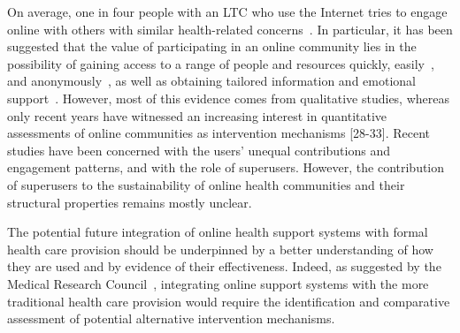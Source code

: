 On average, one in four people with an LTC who use the Internet tries to engage online with others with similar health-related concerns~\cite{fox2011social}. In particular, it has been suggested that the value of participating in an online community lies in the possibility of gaining access to a range of people and resources quickly, easily~\cite{armstrong2000real}, and anonymously~\cite{pendry2015individual}, as well as obtaining tailored information and emotional support~\cite{ali2015online,de2017adolescents,shoebotham2016therapeutic,coulson2005receiving,de2016stroke}. However, most of this evidence comes from qualitative studies, whereas only recent years have witnessed an increasing interest in quantitative assessments of online communities as intervention mechanisms [28-33]. Recent studies have been concerned with the users’ unequal contributions and engagement patterns, and with the role of superusers. However, the contribution of superusers to the sustainability of online health communities and their structural properties remains mostly unclear.

The potential future integration of online health support systems with formal health care provision should be underpinned by a better understanding of how they are used and by evidence of their effectiveness. Indeed, as suggested by the Medical Research Council~\cite{Craiga1655}, integrating online support systems with the more traditional health care provision would require the identification and comparative assessment of potential alternative intervention mechanisms.


